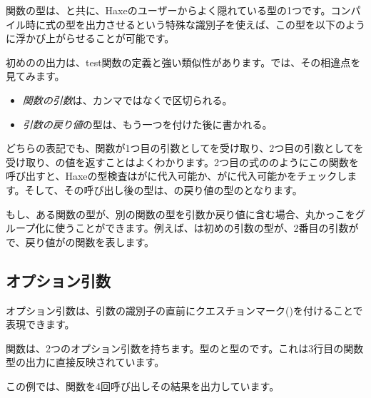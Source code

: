 
関数の型は、と共に、Haxeのユーザーからよく隠れている型の1つです。コンパイル時に式の型を出力させるという特殊な識別子を使えば、この型を以下のように浮かび上がらせることが可能です。


初めのの出力は、test関数の定義と強い類似性があります。では、その相違点を見てみます。

\begin{itemize}
	\item \emph{関数の引数}は、カンマではなく\expr{->}で区切られる。
	\item \emph{引数の戻り値}の型は、もう一つ\expr{->}を付けた後に書かれる。
\end{itemize}

どちらの表記でも、関数が1つ目の引数としてを受け取り、2つ目の引数としてを受け取り、の値を返すことはよくわかります。2つ目の式ののようにこの関数を呼び出すと、Haxeの型検査はがに代入可能か、がに代入可能かをチェックします。そして、その呼び出し後の型は、の戻り値の型のとなります。

もし、ある関数の型が、別の関数の型を引数か戻り値に含む場合、丸かっこをグループ化に使うことができます。例えば、は初めの引数の型が、2番目の引数がで、戻り値がの関数を表します。

\subsection{オプション引数}
\label{types-function-optional-arguments}

オプション引数は、引数の識別子の直前にクエスチョンマーク()を付けることで表現できます。


関数は、2つのオプション引数を持ちます。型のと型のです。これは3行目の関数型の出力に直接反映されています。

この例では、関数を4回呼び出しその結果を出力しています。

